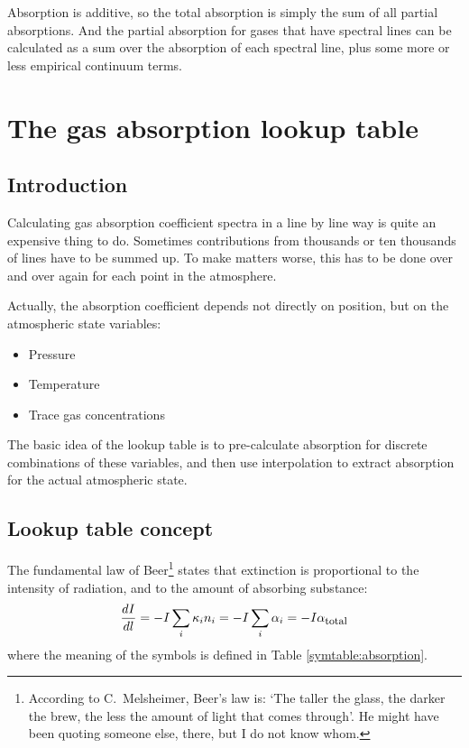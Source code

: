 Absorption is additive, so the total absorption is simply the sum of
all partial absorptions.  And the partial absorption for gases that
have spectral lines can be calculated as a sum over the absorption of
each spectral line, plus some more or less empirical continuum terms.


\section{The gas absorption lookup table}
\label{sec:absorption:lookup}

\subsection{Introduction}

Calculating gas absorption coefficient spectra in a line by line way
is quite an expensive thing to do. Sometimes contributions from
thousands or ten thousands of lines have to be summed up. To make
matters worse, this has to be done over and over again for each point
in the atmosphere.

Actually, the absorption coefficient depends not directly on position,
but on the atmospheric state variables:
\begin{itemize}
\item Pressure
\item Temperature
\item Trace gas concentrations
\end{itemize}

The basic idea of the lookup table is to pre-calculate absorption for
discrete combinations of these variables, and then use interpolation
to extract absorption for the actual atmospheric state.

\subsection{Lookup table concept}

The fundamental law of Beer\footnote{According to C.\ Melsheimer,
  Beer's law is: `The taller the glass, the darker the brew, the less
  the amount of light that comes through'. He might have been quoting
  someone else, there, but I do not know whom.} states that extinction
is proportional to the intensity of radiation, and to the amount of
absorbing substance:
\begin{equation}
  \label{eq:lookup:beer}
  \frac{d I}{d l}
  =
  - I \sum_i {\kappa}_{i} {n}_{i}
  =
  - I \sum_i {\alpha}_{i}
  =
  - I {\alpha}_{\mbox{\footnotesize total}}
\end{equation}
where the meaning of the symbols is defined in Table
\ref{symtable:absorption}. 

